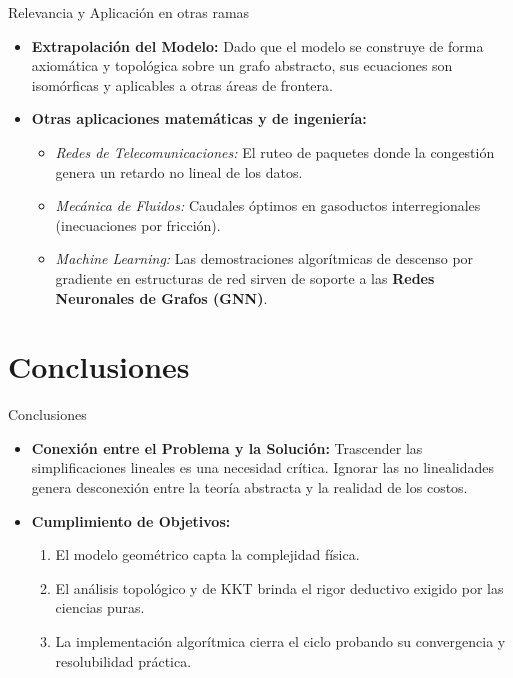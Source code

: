 \documentclass[10pt]{beamer}
\begin{document}
\begin{frame}{Relevancia y Aplicación en otras ramas}
    \begin{itemize}
        \item \textbf{Extrapolación del Modelo:} Dado que el modelo se construye de forma axiomática y topológica sobre un grafo abstracto, sus ecuaciones son isomórficas y aplicables a otras áreas de frontera.
        \vspace{0.3cm}
        \item \textbf{Otras aplicaciones matemáticas y de ingeniería:}
        \begin{itemize}
            \item \textit{Redes de Telecomunicaciones:} El ruteo de paquetes donde la congestión genera un retardo no lineal de los datos.
            \item \textit{Mecánica de Fluidos:} Caudales óptimos en gasoductos interregionales (inecuaciones por fricción).
            \item \textit{Machine Learning:} Las demostraciones algorítmicas de descenso por gradiente en estructuras de red sirven de soporte a las \textbf{Redes Neuronales de Grafos (GNN)}.
        \end{itemize}
    \end{itemize}
\end{frame}

\section{Conclusiones}

\begin{frame}{Conclusiones}
    \begin{itemize}
        \item \textbf{Conexión entre el Problema y la Solución:} Trascender las simplificaciones lineales es una necesidad crítica. Ignorar las no linealidades genera desconexión entre la teoría abstracta y la realidad de los costos.
        \item \textbf{Cumplimiento de Objetivos:} 
        \begin{enumerate}
            \item El modelo geométrico capta la complejidad física.
            \item El análisis topológico y de KKT brinda el rigor deductivo exigido por las ciencias puras.
            \item La implementación algorítmica cierra el ciclo probando su convergencia y resolubilidad práctica.
        \end{enumerate}
    \end{itemize}
\end{frame}
\end{document}
